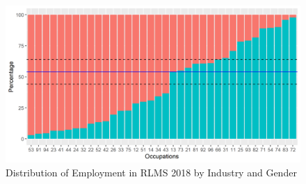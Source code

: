 \documentclass[12pt,a4paper]{article}
\numberwithin{equation}{section}
\begin{document}
{\begin{table}[ht]
\begin{tabular}{p{2.5cm}l>{\raggedleft\arraybackslash}p{1.5cm}>{\raggedleft\arraybackslash}p{3cm}>{\raggedleft\arraybackslash}p{1.5cm}}
\end{tabular}
\end{table}

\lipsum[1]

\lipsum[2-3]


\begin{figure}[H]
     \centering
     \hspace*{-0.7in}
     \includegraphics{gen_occ18.png}
  \caption{Distribution of Employment in RLMS 2018 by Industry and Gender}\label{fig:5}
\end{figure}


}
\end{document}
